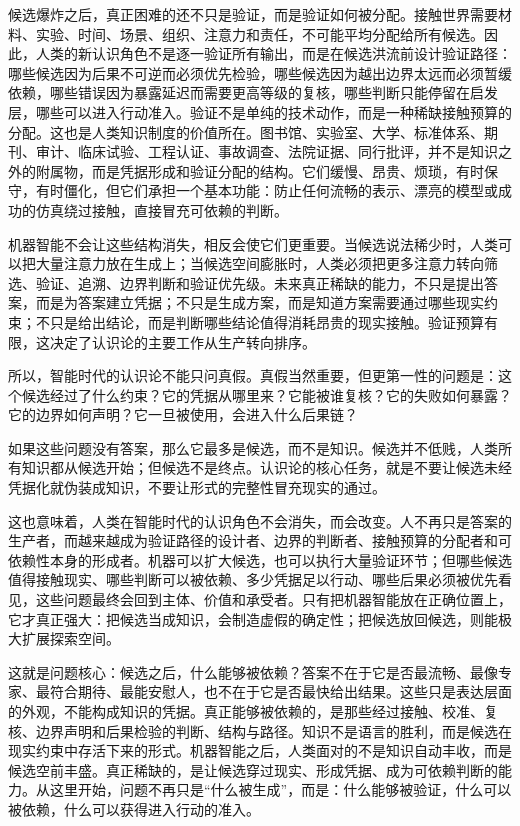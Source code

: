
候选爆炸之后，真正困难的还不只是验证，而是验证如何被分配。接触世界需要材料、实验、时间、场景、组织、注意力和责任，不可能平均分配给所有候选。因此，人类的新认识角色不是逐一验证所有输出，而是在候选洪流前设计验证路径：哪些候选因为后果不可逆而必须优先检验，哪些候选因为越出边界太远而必须暂缓依赖，哪些错误因为暴露延迟而需要更高等级的复核，哪些判断只能停留在启发层，哪些可以进入行动准入。验证不是单纯的技术动作，而是一种稀缺接触预算的分配。这也是人类知识制度的价值所在。图书馆、实验室、大学、标准体系、期刊、审计、临床试验、工程认证、事故调查、法院证据、同行批评，并不是知识之外的附属物，而是凭据形成和验证分配的结构\cite{merton1942normative}。它们缓慢、昂贵、烦琐，有时保守，有时僵化，但它们承担一个基本功能：防止任何流畅的表示、漂亮的模型或成功的仿真绕过接触，直接冒充可依赖的判断。

机器智能不会让这些结构消失，相反会使它们更重要。当候选说法稀少时，人类可以把大量注意力放在生成上；当候选空间膨胀时，人类必须把更多注意力转向筛选、验证、追溯、边界判断和验证优先级。未来真正稀缺的能力，不只是提出答案，而是为答案建立凭据；不只是生成方案，而是知道方案需要通过哪些现实约束；不只是给出结论，而是判断哪些结论值得消耗昂贵的现实接触。验证预算有限，这决定了认识论的主要工作从生产转向排序。

所以，智能时代的认识论不能只问真假。真假当然重要，但更第一性的问题是：这个候选经过了什么约束？它的凭据从哪里来？它能被谁复核？它的失败如何暴露？它的边界如何声明？它一旦被使用，会进入什么后果链？

如果这些问题没有答案，那么它最多是候选，而不是知识。候选并不低贱，人类所有知识都从候选开始；但候选不是终点。认识论的核心任务，就是不要让候选未经凭据化就伪装成知识，不要让形式的完整性冒充现实的通过。

这也意味着，人类在智能时代的认识角色不会消失，而会改变。人不再只是答案的生产者，而越来越成为验证路径的设计者、边界的判断者、接触预算的分配者和可依赖性本身的形成者。机器可以扩大候选，也可以执行大量验证环节；但哪些候选值得接触现实、哪些判断可以被依赖、多少凭据足以行动、哪些后果必须被优先看见，这些问题最终会回到主体、价值和承受者。只有把机器智能放在正确位置上，它才真正强大：把候选当成知识，会制造虚假的确定性；把候选放回候选，则能极大扩展探索空间。

这就是问题核心：候选之后，什么能够被依赖？答案不在于它是否最流畅、最像专家、最符合期待、最能安慰人，也不在于它是否最快给出结果。这些只是表达层面的外观，不能构成知识的凭据。真正能够被依赖的，是那些经过接触、校准、复核、边界声明和后果检验的判断、结构与路径。知识不是语言的胜利，而是候选在现实约束中存活下来的形式。机器智能之后，人类面对的不是知识自动丰收，而是候选空前丰盛。真正稀缺的，是让候选穿过现实、形成凭据、成为可依赖判断的能力。从这里开始，问题不再只是“什么被生成”，而是：什么能够被验证，什么可以被依赖，什么可以获得进入行动的准入。

